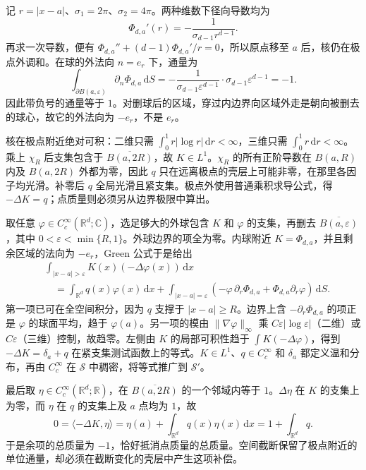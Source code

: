 \begin{solution}
记 \(r=|x-a|\)、\(\sigma_1=2\pi\)、\(\sigma_2=4\pi\)。两种维数下径向导数均为
\[
 \Phi_{d,a}'(r)=-\frac1{\sigma_{d-1}r^{d-1}}.
\]
再求一次导数，便有 \(\Phi_{d,a}''+(d-1)\Phi_{d,a}'/r=0\)，所以原点移至 \(a\) 后，核仍在极点外调和。在球的外法向 \(n=e_r\) 下，通量为
\[
 \int_{\partial B(a,\varepsilon)}\partial_n\Phi_{d,a}\,\mathrm dS
 =-\frac1{\sigma_{d-1}\varepsilon^{d-1}}
      \cdot\sigma_{d-1}\varepsilon^{d-1}=-1.
\]
因此带负号的通量等于 \(1\)。对删球后的区域，穿过内边界向区域外走是朝向被删去的球心，故它的外法向为 \(-e_r\)，不是 \(e_r\)。

核在极点附近绝对可积：二维只需 \(\int_0^1r|\log r|\,\mathrm dr<\infty\)，三维只需 \(\int_0^1r\,\mathrm dr<\infty\)。乘上 \(\chi_R\) 后支集包含于 \(\overline{B(a,2R)}\)，故 \(K\in L^1\)。\(\chi_R\) 的所有正阶导数在 \(B(a,R)\) 内及 \(B(a,2R)\) 外都为零，因此 \(q\) 只在远离极点的壳层上可能非零，在那里各因子均光滑。补零后 \(q\) 全局光滑且紧支集。极点外使用普通乘积求导公式，得 \(-\Delta K=q\)；点质量则必须另从边界极限中算出。

取任意 \(\varphi\in C_c^\infty(\mathbb R^d;\mathbb C)\)，选足够大的外球包含 \(K\) 和 \(\varphi\) 的支集，再删去 \(\overline{B(a,\varepsilon)}\)，其中 \(0<\varepsilon<\min\{R,1\}\)。外球边界的项全为零。内球附近 \(K=\Phi_{d,a}\)，并且剩余区域的法向为 \(-e_r\)，Green 公式于是给出
\[
 \begin{aligned}
 &\int_{|x-a|>\varepsilon}K(x)(-\Delta\varphi(x))\,\mathrm dx\\
 &\quad=\int_{\mathbb R^d}q(x)\varphi(x)\,\mathrm dx
       +\int_{|x-a|=\varepsilon}
        \left(-\varphi\,\partial_r\Phi_{d,a}
                     +\Phi_{d,a}\partial_r\varphi\right)\,\mathrm dS.
 \end{aligned}
\]
第一项已可在全空间积分，因为 \(q\) 支撑于 \(|x-a|\geq R\)。边界上含 \(-\partial_r\Phi_{d,a}\) 的项正是 \(\varphi\) 的球面平均，趋于 \(\varphi(a)\)。另一项的模由 \(\|\nabla\varphi\|_\infty\) 乘 \(C\varepsilon|\log\varepsilon|\)（二维）或 \(C\varepsilon\)（三维）控制，故趋零。左侧由 \(K\) 的局部可积性趋于 \(\int K(-\Delta\varphi)\)，得到 \(-\Delta K=\delta_a+q\) 在紧支集测试函数上的等式。\(K\in L^1\)、\(q\in C_c^\infty\) 和 \(\delta_a\) 都定义温和分布，再由 \(C_c^\infty\) 在 \(\mathcal S\) 中稠密，将等式推广到 \(\mathcal S'\)。

最后取 \(\eta\in C_c^\infty(\mathbb R^d;\mathbb R)\)，在 \(\overline{B(a,2R)}\) 的一个邻域内等于 \(1\)。\(\Delta\eta\) 在 \(K\) 的支集上为零，而 \(\eta\) 在 \(q\) 的支集上及 \(a\) 点均为 \(1\)，故
\[
 0=\langle-\Delta K,\eta\rangle
  =\eta(a)+\int_{\mathbb R^d}q(x)\eta(x)\,\mathrm dx
  =1+\int_{\mathbb R^d}q.
\]
于是余项的总质量为 \(-1\)，恰好抵消点质量的总质量。空间截断保留了极点附近的单位通量，却必须在截断变化的壳层中产生这项补偿。
\end{solution}

